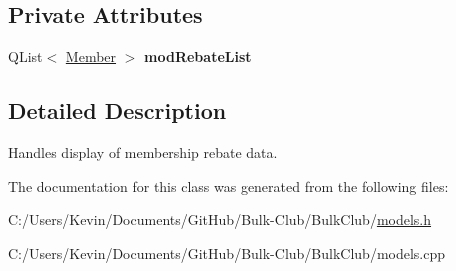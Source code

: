 \subsection*{Private Attributes}
\begin{DoxyCompactItemize}
\item 
\mbox{\label{class_rebate_model_ac0c8aa550fbf1fbcfcd91262651a9e2f}} 
Q\+List$<$ \mbox{\hyperlink{class_member}{Member}} $>$ {\bfseries mod\+Rebate\+List}
\end{DoxyCompactItemize}


\subsection{Detailed Description}
Handles display of membership rebate data. 

The documentation for this class was generated from the following files\+:\begin{DoxyCompactItemize}
\item 
C\+:/\+Users/\+Kevin/\+Documents/\+Git\+Hub/\+Bulk-\/\+Club/\+Bulk\+Club/\mbox{\hyperlink{models_8h}{models.\+h}}\item 
C\+:/\+Users/\+Kevin/\+Documents/\+Git\+Hub/\+Bulk-\/\+Club/\+Bulk\+Club/models.\+cpp\end{DoxyCompactItemize}
